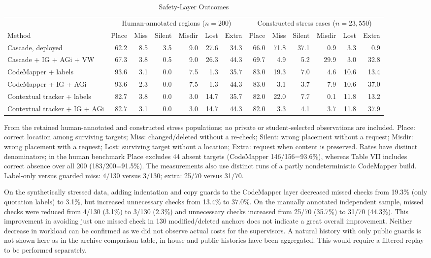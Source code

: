 \documentclass[10pt,conference,letterpaper]{IEEEtran}
\begin{document}
\begin{table}[!t]
\caption{Safety-Layer Outcomes}
\label{tab:retained-guards}
\centering\footnotesize\setlength{\tabcolsep}{4.5pt}
\begin{tabular}{lrrrrrr|rrrrrr}
\hline
& \multicolumn{6}{c|}{Human-annotated regions ($n=200$)} & \multicolumn{6}{c}{Constructed stress cases ($n=23,550$)} \\
Method & Place & Miss & Silent & Misdir & Lost & Extra & Place & Miss & Silent & Misdir & Lost & Extra \\
\hline
Cascade, deployed & 62.2 & 8.5 & 3.5 & 9.0 & 27.6 & 34.3 & 66.0 & 71.8 & 37.1 & 0.9 & 3.3 & 0.9 \\
Cascade + IG + AGi + VW & 67.3 & 3.8 & 0.5 & 9.0 & 26.3 & 44.3 & 69.7 & 4.9 & 5.2 & 29.9 & 3.0 & 32.8 \\
CodeMapper + labels & 93.6 & 3.1 & 0.0 & 7.5 & 1.3 & 35.7 & 83.0 & 19.3 & 7.0 & 4.6 & 10.6 & 13.4 \\
CodeMapper + IG + AGi & 93.6 & 2.3 & 0.0 & 7.5 & 1.3 & 44.3 & 83.0 & 3.1 & 3.7 & 7.9 & 10.6 & 37.0 \\
Contextual tracker + labels & 82.7 & 3.8 & 0.0 & 3.0 & 14.7 & 35.7 & 82.0 & 22.0 & 7.7 & 0.1 & 11.8 & 13.2 \\
Contextual tracker + IG + AGi & 82.7 & 3.1 & 0.0 & 3.0 & 14.7 & 44.3 & 82.0 & 3.3 & 4.1 & 3.7 & 11.8 & 37.9 \\
\hline
\end{tabular}
\parbox{.97\textwidth}{\footnotesize From the retained human-annotated and constructed stress populations; no private or student-selected observations are included. Place: correct location among surviving targets; Miss: changed/deleted without a re-check; Silent: wrong placement without a request; Misdir: wrong placement with a request; Lost: surviving target without a location; Extra: request when content is preserved. Rates have distinct denominators; in the human benchmark Place excludes 44 absent targets (CodeMapper 146/156=93.6\%), whereas Table VII includes correct absence over all 200 (183/200=91.5\%). The measurements also use distinct runs of a partly nondeterministic CodeMapper build. Label-only versus guarded miss: 4/130 versus 3/130; extra: 25/70 versus 31/70.}
\end{table}

On the synthetically stressed data, adding indentation and copy guards to the CodeMapper layer decreased missed checks from 19.3\% (only quotation labels) to 3.1\%, but increased unnecessary checks from 13.4\% to 37.0\%. On the manually annotated independent sample, missed checks were reduced from 4/130 (3.1\%) to 3/130 (2.3\%) and unnecessary checks increased from 25/70 (35.7\%) to 31/70 (44.3\%). This improvement in avoiding just one missed check in 130 modified/deleted anchors does not indicate a great overall improvement. Neither decrease in workload can be confirmed as we did not observe actual costs for the supervisors. A natural history with only public guards is not shown here as in the archive comparison table, in-house and public histories have been aggregated. This would require a filtered replay to be performed separately.
\end{document}
